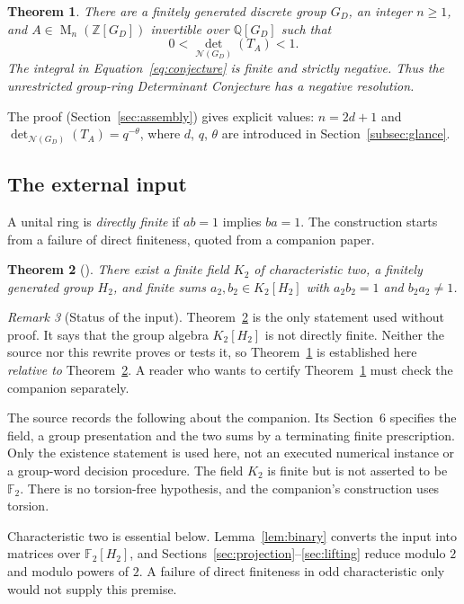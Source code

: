 \documentclass[11pt]{article}
\newtheorem{theorem}{Theorem}[section]
\theoremstyle{remark}
\newtheorem{remark}[theorem]{Remark}
\numberwithin{equation}{section}
\newcommand{\F}{\mathbb F}
\newcommand{\Z}{\mathbb Z}
\newcommand{\Q}{\mathbb Q}
\newcommand{\Mat}{\operatorname{M}}
\newcommand{\N}{\mathcal N}
\begin{document}
\begin{theorem}\label{thm:main}
There are a finitely generated discrete group $G_D$, an integer
$n\ge1$, and $A\in\Mat_n(\Z[G_D])$ invertible over $\Q[G_D]$ such
that
\[
 0<\det_{\N(G_D)}(T_A)<1.
\]
The integral in Equation~\eqref{eq:conjecture} is finite and strictly
negative. Thus the unrestricted group-ring Determinant Conjecture
has a negative resolution.
\end{theorem}

The proof (Section~\ref{sec:assembly}) gives explicit values: $n=2d+1$ and $\det_{\N(G_D)}(T_A)=q^{-\theta}$, where $d$, $q$, $\theta$ are introduced in Section~\ref{subsec:glance}.

\subsection{The external input}

A unital ring is \emph{directly finite} if $ab=1$ implies $ba=1$. The construction starts from a failure of direct finiteness, quoted from a companion paper.

\begin{theorem}[{\cite[Theorem 1.1]{CharacteristicTwo}}]
\label{thm:input}
There exist a finite field $K_2$ of characteristic two, a finitely
generated group $H_2$, and finite sums $a_2,b_2\in K_2[H_2]$ with
$a_2b_2=1$ and $b_2a_2\ne1$.
\end{theorem}

\begin{remark}[Status of the input]\label{rem:input-status}
Theorem~\ref{thm:input} is the only statement used without proof. It says that the group algebra $K_2[H_2]$ is not directly finite. Neither the source nor this rewrite proves or tests it, so Theorem~\ref{thm:main} is established here \emph{relative to} Theorem~\ref{thm:input}. A reader who wants to certify Theorem~\ref{thm:main} must check the companion separately.

The source records the following about the companion. Its Section~6 specifies the field, a group presentation and the two sums by a terminating finite prescription. Only the existence statement is used here, not an executed numerical instance or a group-word decision procedure. The field $K_2$ is finite but is not asserted to be $\F_2$. There is no torsion-free hypothesis, and the companion's construction uses torsion.

Characteristic two is essential below. Lemma~\ref{lem:binary} converts the input into matrices over $\F_2[H_2]$, and Sections~\ref{sec:projection}--\ref{sec:lifting} reduce modulo $2$ and modulo powers of $2$. A failure of direct finiteness in odd characteristic only would not supply this premise.
\end{remark}
\end{document}
